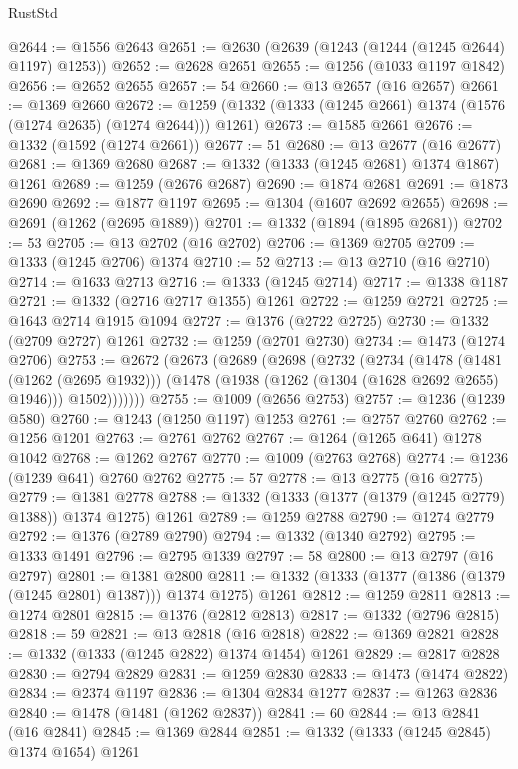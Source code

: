 \begin{lexlean}{RustStd}
\begin{coremodule}
{\begin{coremodule}
{{{{{{{{{{{{{{{{{{{{{{{{{{{{{{{{{{{@2644 := @1556 @2643
@2651 := @2630 (@2639 (@1243 (@1244 (@1245 @2644) @1197) @1253))
@2652 := @2628 @2651
@2655 := @1256 (@1033 @1197 @1842)
@2656 := @2652 @2655
@2657 := 54
@2660 := @13 @2657 (@16 @2657)
@2661 := @1369 @2660
@2672 := @1259 (@1332 (@1333 (@1245 @2661) @1374 (@1576 (@1274 @2635) (@1274 @2644))) @1261)
@2673 := @1585 @2661
@2676 := @1332 (@1592 (@1274 @2661))
@2677 := 51
@2680 := @13 @2677 (@16 @2677)
@2681 := @1369 @2680
@2687 := @1332 (@1333 (@1245 @2681) @1374 @1867) @1261
@2689 := @1259 (@2676 @2687)
@2690 := @1874 @2681
@2691 := @1873 @2690
@2692 := @1877 @1197
@2695 := @1304 (@1607 @2692 @2655)
@2698 := @2691 (@1262 (@2695 @1889))
@2701 := @1332 (@1894 (@1895 @2681))
@2702 := 53
@2705 := @13 @2702 (@16 @2702)
@2706 := @1369 @2705
@2709 := @1333 (@1245 @2706) @1374
@2710 := 52
@2713 := @13 @2710 (@16 @2710)
@2714 := @1633 @2713
@2716 := @1333 (@1245 @2714)
@2717 := @1338 @1187
@2721 := @1332 (@2716 @2717 @1355) @1261
@2722 := @1259 @2721
@2725 := @1643 @2714 @1915 @1094
@2727 := @1376 (@2722 @2725)
@2730 := @1332 (@2709 @2727) @1261
@2732 := @1259 (@2701 @2730)
@2734 := @1473 (@1274 @2706)
@2753 := @2672
    (@2673
      (@2689
        (@2698
          (@2732
            (@2734
              (@1478
                (@1481 (@1262 (@2695 @1932)))
                (@1478 (@1938 (@1262 (@1304 (@1628 @2692 @2655) @1946))) @1502)))))))
@2755 := @1009 (@2656 @2753)
@2757 := @1236 (@1239 @580)
@2760 := @1243 (@1250 @1197) @1253
@2761 := @2757 @2760
@2762 := @1256 @1201
@2763 := @2761 @2762
@2767 := @1264 (@1265 @641) @1278 @1042
@2768 := @1262 @2767
@2770 := @1009 (@2763 @2768)
@2774 := @1236 (@1239 @641) @2760 @2762
@2775 := 57
@2778 := @13 @2775 (@16 @2775)
@2779 := @1381 @2778
@2788 := @1332 (@1333 (@1377 (@1379 (@1245 @2779) @1388)) @1374 @1275) @1261
@2789 := @1259 @2788
@2790 := @1274 @2779
@2792 := @1376 (@2789 @2790)
@2794 := @1332 (@1340 @2792)
@2795 := @1333 @1491
@2796 := @2795 @1339
@2797 := 58
@2800 := @13 @2797 (@16 @2797)
@2801 := @1381 @2800
@2811 := @1332 (@1333 (@1377 (@1386 (@1379 (@1245 @2801) @1387))) @1374 @1275) @1261
@2812 := @1259 @2811
@2813 := @1274 @2801
@2815 := @1376 (@2812 @2813)
@2817 := @1332 (@2796 @2815)
@2818 := 59
@2821 := @13 @2818 (@16 @2818)
@2822 := @1369 @2821
@2828 := @1332 (@1333 (@1245 @2822) @1374 @1454) @1261
@2829 := @2817 @2828
@2830 := @2794 @2829
@2831 := @1259 @2830
@2833 := @1473 (@1474 @2822)
@2834 := @2374 @1197
@2836 := @1304 @2834 @1277
@2837 := @1263 @2836
@2840 := @1478 (@1481 (@1262 @2837))
@2841 := 60
@2844 := @13 @2841 (@16 @2841)
@2845 := @1369 @2844
@2851 := @1332 (@1333 (@1245 @2845) @1374 @1654) @1261
}}}}}}}}}}}}}}}}}}}}}}}}}}}}}}}}}}}
\end{coremodule}}
\end{coremodule}
\end{lexlean}
